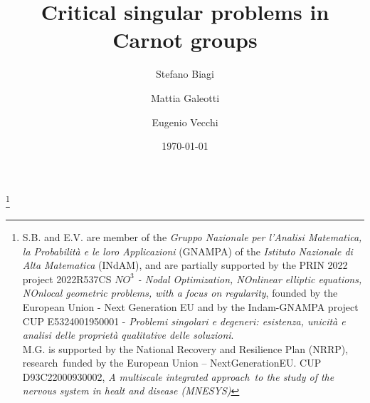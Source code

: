 \documentclass[11pt]{amsart}
\numberwithin{equation}{section} %
\theoremstyle{definition}
\begin{document}
 	\title[Critical singular problems in Carnot groups]{Critical singular problems in Carnot groups}
 	
 	\author[S.\,Biagi]{Stefano Biagi}
 	\author[M.\,Galeotti]{Mattia Galeotti}
 	\author[E.\,Vecchi]{Eugenio Vecchi}
 	
 	\address[S.\,Biagi]{Dipartimento di Matematica
 		\newline\indent Politecnico di Milano \newline\indent
 		Via Bonardi 9, 20133 Milano, Italy}
 	
 	\address[M.\,Galeotti]{Dipartimento di Matematica
 		\newline\indent Università  di Bologna \newline\indent
 		Piazza di Porta San Donato 5, 40122 Bologna, Italy}
 	
 	\address[E.\,Vecchi]{Dipartimento di Matematica
 		\newline\indent Università  di Bologna \newline\indent
 		Piazza di Porta San Donato 5, 40122 Bologna, Italy}
 	
 	
 	
 	\date{\today}
 	
 	\thanks{S.B. and E.V. are
 		member of the {\em Gruppo Nazionale per
 			l'Analisi Ma\-te\-ma\-ti\-ca, la Probabilit\`a e le loro Applicazioni}
 		(GNAMPA) of the {\em Istituto Nazionale di Alta Matematica} (INdAM), and are
 		partially 
 		supported by the PRIN 2022 project 2022R537CS \emph{$NO^3$ - Nodal Optimization, NOnlinear elliptic equations, NOnlocal geometric problems, with a focus on regularity}, founded by the European Union - Next Generation EU and by the Indam-GNAMPA project CUP E5324001950001 - {\em Problemi singolari e degeneri: esistenza, unicità e analisi delle proprietà qualitative delle soluzioni}.\\
 		M.G. is supported by the National Recovery and Resilience Plan (NRRP), research funded by the European Union – NextGenerationEU.
 		CUP D93C22000930002, {\em A multiscale integrated approach to the study of the nervous system in healt and disease (MNESYS)}}
 	
\end{document}
